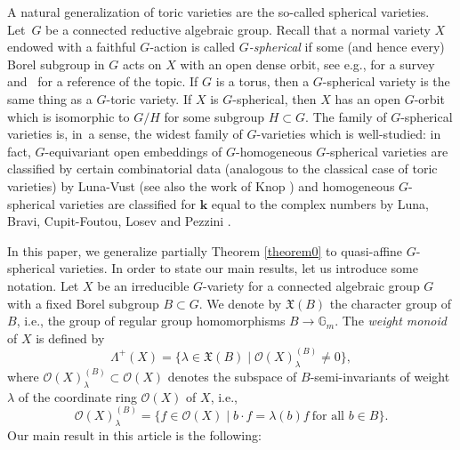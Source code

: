 \documentclass[11pt]{article}
\newcommand{\ie}{i.e.,\xspace}
\newcommand{\eg}{e.g.,\xspace}
\numberwithin{equation}{section}
\let\mathcal\mathscr
\theoremstyle{plain}
\theoremstyle{definition}
\newcommand{\OO}{\mathcal{O}}
\newcommand{\GG}{\mathbb{G}}
\newcommand{\kk}{{\boldsymbol{k}}}
\newcommand{\name}[1]{#1}
\newcommand{\set}[2]{\{#1 \mid #2\}}
\begin{document}
A natural generalization of toric varieties are the so-called spherical varieties.
Let~$G$ be a connected reductive algebraic group.
Recall that a normal variety $X$ endowed with a faithful $G$-action
is called \emph{$G$-spherical} if some (and hence every)
Borel subgroup in $G$ acts on $X$ with an open dense orbit, see
\eg \cite{Br2010Introduction-to-ac} for a survey
and~\cite{Ti2011Homogeneous-spaces} for a reference of the topic. If $G$ is a torus, then a $G$-spherical variety is the same thing as a $G$-toric variety.
If $X$ is $G$-spherical, then
$X$ has an open $G$-orbit which is isomorphic to $G/H$ for some subgroup $H \subset G$.
The family of $G$-spherical varieties is, in~a sense, the widest family of $G$-varieties which is well-studied: in fact, $G$-equivariant open embeddings of $G$-homogeneous
$G$-spherical varieties are classified
by certain combinatorial data (analogous to the classical case of toric varieties)
by \name{Luna-Vust} \cite{LuVu1983Plongements-despac} (see also the work of \name{Knop} \cite{Kn1991The-Luna-Vust-theo})
and homogeneous $G$-spherical varieties are classified for $\kk$ equal to the complex numbers
by \name{Luna}, \name{Bravi}, \name{Cupit-Foutou}, \name{Losev} and \name{Pezzini}
\cite{Lu2001Varietes-spherique, BrPe2005Wonderful-varietie, Br2007Wonderful-varietie,
Lu2007La-variete-magnifi, Lo2009Uniqueness-propert, BrCu2010Classification-of-, Cu2014Wonderful-Varietie}.

In this paper, we generalize partially Theorem \ref{theorem0} to quasi-affine $G$-spherical varieties.
In order to state our main results, let us introduce some notation. Let
$X$ be an irreducible $G$-variety for a connected algebraic group $G$ with a fixed Borel subgroup
$B \subset G$.
We denote by $\mathfrak{X}(B)$ the character group
of $B$, \ie the group of regular group homomorphisms $B \to \GG_m$.
The \emph{weight monoid} of $X$ is defined by
\[
\Lambda^+(X) = \{\lambda \in \mathfrak{X}(B) \mid \OO(X)_{\lambda}^{(B)} \neq 0\},
\]
where $\OO(X)_{\lambda}^{(B)} \subset \OO(X)$
denotes the subspace of $B$-semi-invariants of weight $\lambda$
of the coordinate ring $\OO(X)$ of $X$, \ie
\[
\OO(X)_{\lambda}^{(B)} = \set{f \in \OO(X)}{b \cdot f = \lambda(b) f \ \textrm{for all $b \in B$}}.
\]
Our main result in this article is the following:
\end{document}
